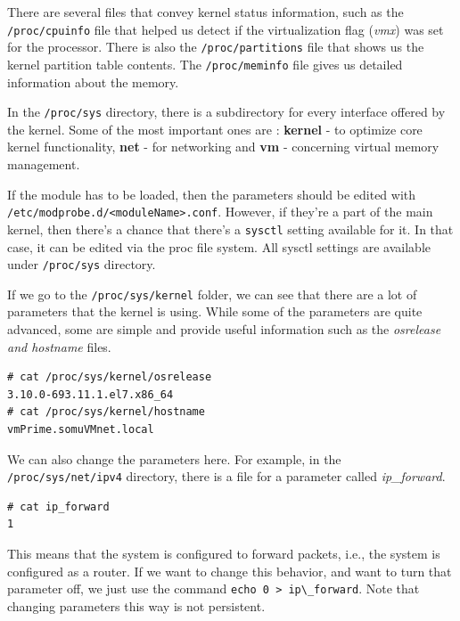 There are several files that convey kernel status information, such as the \verb|/proc/cpuinfo| file that helped us detect if the virtualization flag (\textit{vmx}) was set for the processor. There is also the \verb|/proc/partitions| file that shows us the kernel partition table contents. The \verb|/proc/meminfo| file gives us detailed information about the memory. 

In the \verb|/proc/sys| directory, there is a subdirectory for every interface offered by the kernel. Some of the most important ones are : \textbf{kernel} - to optimize core kernel functionality, \textbf{net} - for networking and \textbf{vm} - concerning virtual memory management.

If the module has to be loaded, then the parameters should be edited with \verb|/etc/modprobe.d/<moduleName>.conf|. However, if they're a part of the main kernel, then there's a chance that there's a \verb|sysctl| setting available for it. In that case, it can be edited via the proc file system. All sysctl settings are available under \verb|/proc/sys| directory. 

If we go to the \verb|/proc/sys/kernel| folder, we can see that there are a lot of parameters that the kernel is using. While some of the parameters are quite advanced, some are simple and provide useful information such as the \textit{osrelease and hostname} files. 

\vspace{-15pt}
\begin{verbatim}
# cat /proc/sys/kernel/osrelease 
3.10.0-693.11.1.el7.x86_64
# cat /proc/sys/kernel/hostname 
vmPrime.somuVMnet.local
\end{verbatim}
\vspace{-10pt}

\noindent
We can also change the parameters here. For example, in the \verb|/proc/sys/net/ipv4| directory, there is a file for a parameter called \textit{ip\_forward}. 

\vspace{-15pt}
\begin{verbatim}
# cat ip_forward
1
\end{verbatim}
\vspace{-10pt}

\noindent
This means that the system is configured to forward packets, i.e., the system is configured as a router. If we want to change this behavior, and want to turn that parameter off, we just use the command \verb|echo 0 > ip\_forward|. Note that changing parameters this way is not persistent. 

